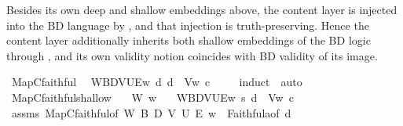 \begin{isabellebody}
{\isafolddocument}%
%
\isadelimdocument
%
\endisadelimdocument
%
\begin{isamarkuptext}%
Besides its own deep and shallow embeddings above, the content layer is
injected into the BD language by , and that injection is truth-preserving.
Hence the content layer additionally inherits both shallow embeddings of the BD
logic through , and its own validity notion coincides with BD validity of
its image.%
\end{isamarkuptext}\isamarkuptrue%
\isamarkupfalse%
\ MapC{\isacharunderscore}{\kern0pt}faithful{\isacharcolon}{\kern0pt}\isanewline
\ \ {\isachardoublequoteopen}{\isasymlangle}W{\isacharcomma}{\kern0pt}B{\isacharcomma}{\kern0pt}D{\isacharcomma}{\kern0pt}V{\isacharcomma}{\kern0pt}U{\isacharcomma}{\kern0pt}E{\isasymrangle}{\isacharcomma}{\kern0pt}w\ {\isasymTurnstile}\isactrlsup d\ {\isacharbraceleft}{\kern0pt}{\isasymphi}{\isacharbraceright}{\kern0pt}\isactrlsup d\ {\isasymlongleftrightarrow}\ V{\isacharcomma}{\kern0pt}w\ {\isasymTurnstile}\isactrlsup c\ {\isasymphi}{\isachardoublequoteclose}\isanewline
%
\isadelimproof
\ \ %
\endisadelimproof
%
\isatagproof
{}\isamarkupfalse%
\ {\isacharparenleft}{\kern0pt}induct\ {\isasymphi}{\isacharparenright}{\kern0pt}\ auto%
\endisatagproof
{\isafoldproof}%
%
\isadelimproof
\isanewline
%
\endisadelimproof
\isanewline
{}\isamarkupfalse%
\ MapC{\isacharunderscore}{\kern0pt}faithful{\isacharunderscore}{\kern0pt}shallow{\isacharcolon}{\kern0pt}\isanewline
\ \ \ {\isachardoublequoteopen}W\ w{\isachardoublequoteclose}\isanewline
\ \ \ {\isachardoublequoteopen}{\isasymlangle}W{\isacharcomma}{\kern0pt}B{\isacharcomma}{\kern0pt}D{\isacharcomma}{\kern0pt}V{\isacharcomma}{\kern0pt}U{\isacharcomma}{\kern0pt}E{\isasymrangle}{\isacharcomma}{\kern0pt}w\ {\isasymTurnstile}\isactrlsup s\ {\isasymlparr}{\isacharbraceleft}{\kern0pt}{\isasymphi}{\isacharbraceright}{\kern0pt}\isactrlsup d{\isasymrparr}\ {\isasymlongleftrightarrow}\ V{\isacharcomma}{\kern0pt}w\ {\isasymTurnstile}\isactrlsup c\ {\isasymphi}{\isachardoublequoteclose}\isanewline
%
\isadelimproof
\ \ %
\endisadelimproof
%
\isatagproof
{}\isamarkupfalse%
\ assms\ MapC{\isacharunderscore}{\kern0pt}faithful{\isacharbrackleft}{\kern0pt}of\ W\ B\ D\ V\ U\ E\ w\ {\isasymphi}{\isacharbrackright}{\kern0pt}\ Faithful{}a{\isacharbrackleft}{\kern0pt}of\ {\isachardoublequoteopen}{\isacharbraceleft}{\kern0pt}{\isasymphi}{\isacharbraceright}{\kern0pt}\isactrlsup d{\isachardoublequoteclose}{\isacharbrackright}{\kern0pt}\ \isamarkupfalse%

\end{isabellebody}
